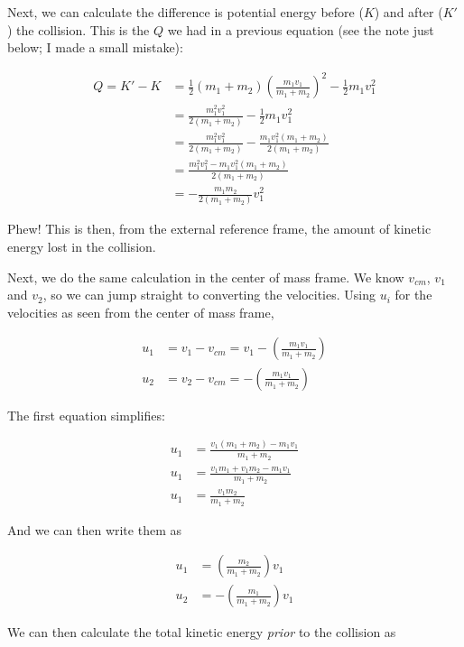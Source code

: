 Next, we can calculate the difference is potential energy before ($K$) and after ($K'$) the collision. This is the $Q$ we had in a previous equation (see the note just below; I made a small mistake):

\begin{align*}
Q = K' - K &= \frac{1}{2} (m_1 + m_2) \left(\frac{m_1 v_1}{m_1 + m_2}\right)^2 - \frac{1}{2} m_1 v_1^2\\
           &= \frac{m_1^2 v_1^2}{2(m_1 + m_2)} - \frac{1}{2} m_1 v_1^2 \\
           &= \frac{m_1^2 v_1^2}{2(m_1 + m_2)} - \frac{m_1 v_1^2(m_1 + m_2)}{2(m_1 + m_2)} \\
           &= \frac{m_1^2 v_1^2 - m_1 v_1^2(m_1 + m_2)}{2(m_1 + m_2)}\\
           &= - \frac{m_1 m_2}{2(m_1 + m_2)} v_1^2 
\end{align*}

Phew! This is then, from the external reference frame, the amount of kinetic energy lost in the collision.

Next, we do the same calculation in the center of mass frame. We know $v_{cm}$, $v_1$ and $v_2$, so we can jump straight to converting the velocities. Using $u_i$ for the velocities as seen from the center of mass frame,

\begin{align}
u_1 &= v_1 - v_{cm} = v_1 - \left(\frac{m_1 v_1}{m_1 + m_2}\right)\\
u_2 &= v_2 - v_{cm} = - \left(\frac{m_1 v_1}{m_1 + m_2}\right)
\end{align}

The first equation simplifies:

\begin{align}
u_1 &= \frac{v_1(m_1 + m_2) - m_1 v_1}{m_1 + m_2}\\
u_1 &= \frac{v_1 m_1 + v_1 m_2 - m_1 v_1}{m_1 + m_2}\\
u_1 &= \frac{v_1 m_2}{m_1 + m_2}
\end{align}

And we can then write them as

\begin{align}
u_1 &= \left(\frac{m_2}{m_1 + m_2}\right) v_1\\
u_2 &= - \left(\frac{m_1}{m_1 + m_2}\right) v_1
\end{align}

We can then calculate the total kinetic energy \emph{prior} to the collision as


